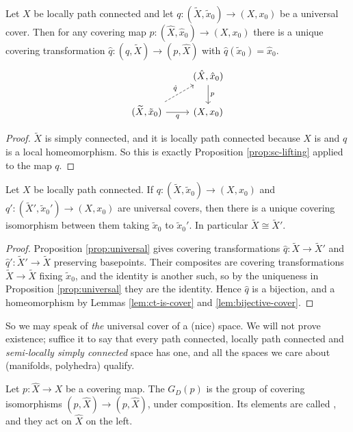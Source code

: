 \begin{proposition} \label{prop:universal}
	Let $X$ be locally path connected and let $q: (\widetilde X, \tilde x_0) \to (X, x_0)$ be a universal cover. Then for any covering map $p: (\hat X, \hat x_0) \to (X, x_0)$ there is a unique covering transformation $\hat q: (q, \widetilde X) \to (p, \hat X)$ with $\hat q (\tilde x_0) = \hat x_0$.
	\[\begin{tikzcd}
		& {(\hat X, \hat x_0)} \arrow[d, "p"] \\
		{(\widetilde X, \tilde x_0)} \arrow[r, "q"'] \arrow[ru, "{\hat q}", dashed] & {(X, x_0)}
	\end{tikzcd}\]
\end{proposition}
\begin{proof}
	$\widetilde X$ is simply connected, and it is locally path connected because $X$ is and $q$ is a local homeomorphism. So this is exactly Proposition \ref{prop:sc-lifting} applied to the map $q$.
\end{proof}

\begin{corollary}
	Let $X$ be locally path connected. If $q: (\widetilde X, \tilde x_0) \to (X,x_0)$ and $q': (\widetilde X', \tilde x_0') \to (X, x_0)$ are universal covers, then there is a unique covering isomorphism between them taking $\tilde x_0$ to $\tilde x_0'$. In particular $\widetilde X \cong \widetilde X'$.
\end{corollary}
\begin{proof}
	Proposition \ref{prop:universal} gives covering transformations $\hat q: \widetilde X \to \widetilde X'$ and $\hat q': \widetilde X' \to \widetilde X$ preserving basepoints. Their composites are covering transformations $\widetilde X \to \widetilde X$ fixing $\tilde x_0$, and the identity is another such, so by the uniqueness in Proposition \ref{prop:universal} they are the identity. Hence $\hat q$ is a bijection, and a homeomorphism by Lemmas \ref{lem:ct-is-cover} and \ref{lem:bijective-cover}.
\end{proof}

So we may speak of \emph{the} universal cover of a (nice) space. We will not prove
existence; suffice it to say that every path connected, locally path connected and
\emph{semi-locally simply connected} space has one, and all the spaces we care about
(manifolds, polyhedra) qualify.

\begin{definition}
	Let $p: \hat X \to X$ be a covering map. The  $G_D(p)$ is the group of covering isomorphisms $(p, \hat X) \to (p, \hat X)$, under composition. Its elements are called , and they act on $\hat X$ on the left.
\end{definition}

